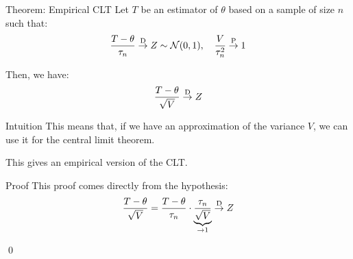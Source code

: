 \documentclass[a4paper]{article}
\begin{document}
\begin{parag}{Theorem: Empirical CLT}
    Let $T$ be an estimator of $\theta$ based on a sample of size $n$ such that:
    \[\frac{T - \theta}{\tau_n} \over{\to}{D} Z \followsdistr \mathcal{N}\left(0, 1\right), \mathspace \frac{V}{\tau^2_n} \over{\to}{P} 1\]

    Then, we have: 
    \[\frac{T - \theta}{\sqrt{V}}\over{\to}{D} Z\]

    \begin{subparag}{Intuition}
        This means that, if we have an approximation of the variance $V$, we can use it for the central limit theorem.

        This gives an empirical version of the CLT.
    \end{subparag}
    
    \begin{subparag}{Proof}
        This proof comes directly from the hypothesis: 
        \[\frac{T - \theta}{\sqrt{V}} = \frac{T - \theta}{\tau_n} \cdot \underbrace{\frac{\tau_n}{\sqrt{V}}}_{\to 1} \over{\to}{D} Z\]

        \qed
    \end{subparag}
\end{parag}
\end{document}
